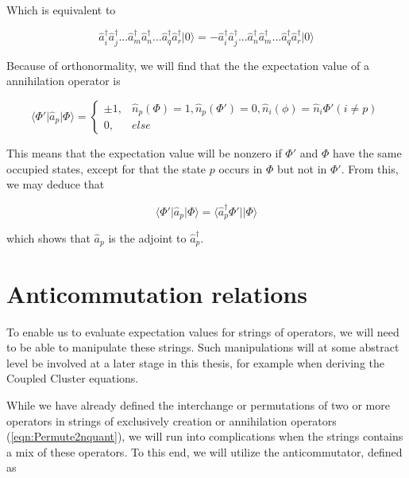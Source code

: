 Which is equivalent to

\begin{equation}
\hat{a}_i^\dagger \hat{a}_j^\dagger  ... \hat{a}_m^\dagger \hat{a}_n^\dagger ... \hat{a}_q^\dagger \hat{a}_r^\dagger \vert 0 \rangle = - \hat{a}_i^\dagger \hat{a}_j^\dagger  ... \hat{a}_n^\dagger \hat{a}_m^\dagger ... \hat{a}_q^\dagger \hat{a}_r^\dagger \vert 0 \rangle
\label{eqn:permuteSD2}
\end{equation}

Because of orthonormality, we will find that the the expectation value of a annihilation operator is

\begin{equation}
\langle \Phi' \vert \hat{a}_p \vert \Phi \rangle = 
\begin{cases}
\pm 1,& \hat{n}_p(\Phi) = 1,  \hat{n}_p(\Phi') = 0,  \hat{n}_i(\phi) = \hat{n}_i{\Phi'}  (i \neq p) \\
0,& else
\end{cases}
\label{eqn:expvalue}
\end{equation}

This means that the expectation value will be nonzero if $\Phi'$ and $\Phi$ have the same occupied states, except for that the state $p$ occurs in $\Phi$ but not in $\Phi'$. From this, we may deduce that

\begin{equation}
\langle \Phi' \vert \hat{a}_p \vert \Phi \rangle = \langle \hat{a}_p^\dagger \Phi' \vert \vert \Phi \rangle
\label{eqn:expvalue2}
\end{equation}

which shows that $\hat{a}_p$ is the adjoint to $ \hat{a}_p^\dagger $.

\section{Anticommutation relations}

To enable us to evaluate expectation values for strings of operators, we will need to be able to manipulate these strings. Such manipulations will at some abstract level be involved at a later stage in this thesis, for example when deriving the Coupled Cluster equations. 

While we have already defined the interchange or permutations of two or more operators in strings of exclusively creation or annihilation operators (\ref{eqn:Permute2nquant}), we will run into complications when the strings contains a mix of these operators. To this end, we will utilize the anticommutator, defined as

